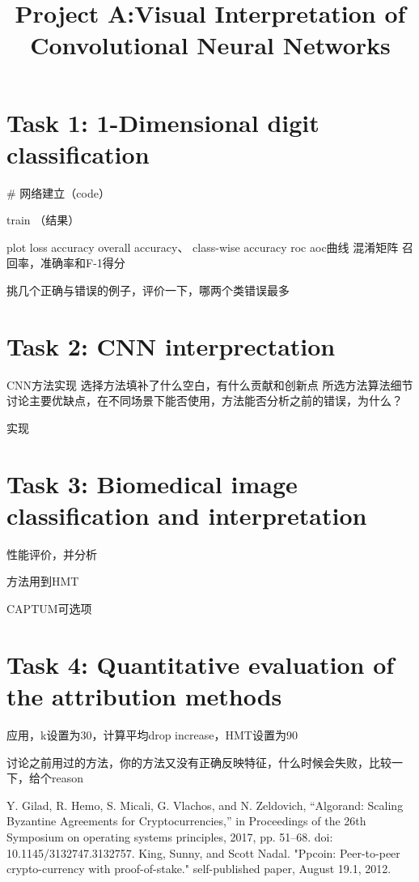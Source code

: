 \documentclass[conference]{IEEEtran}
\begin{document}
\title{Project A:Visual Interpretation of Convolutional Neural Networks}


\author{
\and
{}
}

\maketitle

\begin{abstract}
\end{abstract}

\section{Task 1: 1-Dimensional digit classification}
# 网络建立（code）

train （结果）

plot loss accuracy
overall accuracy、 class-wise accuracy
roc aoc曲线
混淆矩阵
召回率，准确率和F-1得分

挑几个正确与错误的例子，评价一下，哪两个类错误最多
\section{Task 2: CNN interprectation}
CNN方法实现
选择方法填补了什么空白，有什么贡献和创新点
所选方法算法细节
讨论主要优缺点，在不同场景下能否使用，方法能否分析之前的错误，为什么？

实现

\section{Task 3: Biomedical image classification and interpretation}
性能评价，并分析

方法用到HMT

CAPTUM可选项

\section{Task 4: Quantitative evaluation of the attribution methods}
应用，k设置为30，计算平均drop increase，HMT设置为90

讨论之前用过的方法，你的方法又没有正确反映特征，什么时候会失败，比较一下，给个reason


\begin{thebibliography}{00}
Y. Gilad, R. Hemo, S. Micali, G. Vlachos, and N. Zeldovich, “Algorand: Scaling Byzantine Agreements for Cryptocurrencies,” in Proceedings of the 26th Symposium on operating systems principles, 2017, pp. 51–68. doi: 10.1145/3132747.3132757.
 King, Sunny, and Scott Nadal. "Ppcoin: Peer-to-peer crypto-currency with proof-of-stake." self-published paper, August 19.1, 2012.

\end{thebibliography}
\end{document}
